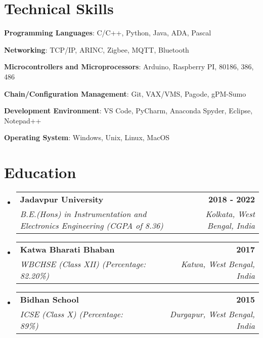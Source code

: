 \documentclass[letterpaper,11pt]{article}
\makeatletter
\newcommand{\resumeItem}[1]{
  \item\small{
    {#1 \vspace{-2pt}}
  }
}
\newcommand{\resumeSubheading}[4]{
  \vspace{-2pt}\item
    \begin{tabular*}{1.0\textwidth}[t]{l@{\extracolsep{\fill}}r}
      \textbf{#1} & \textbf{\small #2} \\
      \textit{\small#3} & \textit{\small #4} \\
    \end{tabular*}\vspace{-7pt}
}
\newcommand{\resumeSubHeadingListStart}{\begin{itemize}[leftmargin=0.0in, label={}]}
\newcommand{\resumeSubHeadingListEnd}{\end{itemize}}
\newcommand{\resumeItemListStart}{\begin{itemize}}
\newcommand{\resumeItemListEnd}{\end{itemize}\vspace{-5pt}}
\makeatother
\begin{document}
\section{Technical Skills}
\begin{multicols}{2}
 \begin{itemize}[leftmargin=0.15in, label={}]
    \small{\item{
     \textbf{Programming Languages}{: C/C++, Python, Java, ADA, Pascal} \\
    \smallskip
    
     \textbf{Networking}{: TCP/IP, ARINC, Zigbee, MQTT, Bluetooth} \\
     \smallskip
     
     \textbf{Microcontrollers and Microprocessors}{: Arduino, Raspberry PI, 80186, 386, 486} \\
     \smallskip
     
     \textbf{Chain/Configuration Management}{: Git, VAX/VMS, Pagode, gPM-Sumo} \\
     \smallskip
     
     \textbf{Development Environment}{: VS Code, PyCharm, Anaconda Spyder, Eclipse, Notepad++} \\
     \smallskip
     
     \textbf{Operating System}{: Windows, Unix, Linux, MacOS} \\
    }}
 \end{itemize}
  \end{multicols}
 \vspace{-3.5pt}

\smallskip
\section{Education}
  \resumeSubHeadingListStart
  \resumeSubheading
    {Jadavpur University}{2018 - 2022}
      {B.E.(Hons) in Instrumentation and Electronics Engineering (CGPA of 8.36)}{Kolkata, West Bengal, India}
    \resumeSubheading
      {Katwa Bharati Bhaban}{2017}
      {WBCHSE (Class XII) (Percentage: 82.20\%)}{Katwa, West Bengal, India}
     \resumeSubheading
      {Bidhan School}{2015}
      {ICSE (Class X) (Percentage: 89\%)}{Durgapur, West Bengal, India}
  \resumeSubHeadingListEnd
\vspace{-9pt}
\end{document}
